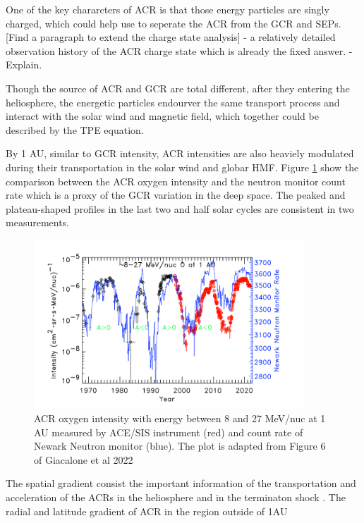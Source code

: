 One of the key chararcters of ACR is that those energy particles are singly charged, which could help use to seperate the ACR from the GCR and SEPs. [Find a paragraph to extend the charge state analysis] - a relatively detailed observation history of the ACR charge state which is already the fixed answer. - Explain.


Though the source of ACR and GCR are total different, after they entering the heliosphere, the energetic particles endourver the same transport process and interact with the solar wind and magnetic field,  which together could be described by the TPE equation.

By 1 AU, similar to GCR intensity, ACR intensities are also heaviely modulated during their transportation in the solar wind and globar \ac{HMF}. Figure \ref{Fig:ACR_solarmodulation} show the comparison between the ACR oxygen intensity and the neutron monitor count rate which is a proxy of the GCR variation in the deep space. The peaked and plateau-shaped profiles in the last two and half solar cycles are consistent in two measurements.


\begin{figure}
	\centering
	\includegraphics[width = 0.9\textwidth]{images/ACR_solarmodulation.png}
	\caption{ACR oxygen intensity with energy between 8 and 27 MeV/nuc at 1 AU measured by ACE/SIS instrument (red) and count rate of Newark Neutron monitor (blue). The plot is adapted from Figure 6 of Giacalone et al 2022}
	\label{Fig:ACR_solarmodulation}
\end{figure}

The spatial gradient consist the important information of the transportation and acceleration of the ACRs in the heliosphere and in the terminaton shock \cite{Rankin 2020}. 
The radial and latitude gradient of ACR in the region outside of 1AU

